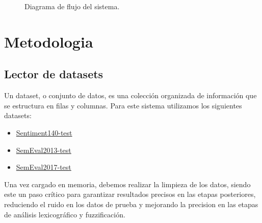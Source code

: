\documentclass[sigconf, review=false, nonacm]{acmart}
\begin{document}
\begin{figure}[ht]
	\centering
	\caption{Diagrama de flujo del sistema.}
	\label{fig:flow-diagram}
\end{figure}

\section{Metodologia}
\subsection{Lector de datasets}
Un dataset, o conjunto de datos, es una colección organizada de información que se estructura en filas y
columnas. Para este sistema utilizamos los siguientes datasets:
\begin{itemize}
	\item \href{https://www.kaggle.com/datasets/krishbaisoya/tweets-sentiment-analysis}{Sentiment140-test}
	\item
	      \href{https://www.kaggle.com/datasets/azzouza2018/semevaldatadets?resource=download&select=semeval-2013-test.csv}{SemEval2013-test}
	\item
	      \href{https://www.kaggle.com/datasets/azzouza2018/semevaldatadets?resource=download&select=semeval-2017-test.csv}{SemEval2017-test}
\end{itemize}

Una vez cargado en memoria, debemos realizar la limpieza de los datos, siendo este un paso crítico para
garantizar resultados precisos en las etapas posteriores, reduciendo el ruido en los datos de prueba y
mejorando la precision en las etapas de análisis lexicográfico y fuzzificación.\\
\end{document}
